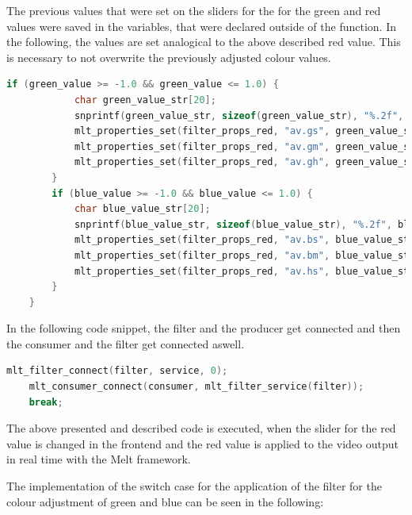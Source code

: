\documentclass[../MasterThesis.tex]{subfiles}
\begin{document}
The previous values that were set on the sliders for the for the green and red values were saved in the variables, that were declared outside of the function. In the following, the values are set analogical to the above described red value. This is necessary to not overwrite the previously adjusted colour values.
	
\begin{lstlisting}[language=c, numbers=none, columns=fullflexible]
		if (green_value >= -1.0 && green_value <= 1.0) {
			char green_value_str[20]; 
			snprintf(green_value_str, sizeof(green_value_str), "%.2f", green_value);
			mlt_properties_set(filter_props_red, "av.gs", green_value_str);
			mlt_properties_set(filter_props_red, "av.gm", green_value_str);	
			mlt_properties_set(filter_props_red, "av.gh", green_value_str);
		} 			
		if (blue_value >= -1.0 && blue_value <= 1.0) {
			char blue_value_str[20]; 
			snprintf(blue_value_str, sizeof(blue_value_str), "%.2f", blue_value);
			mlt_properties_set(filter_props_red, "av.bs", blue_value_str);
			mlt_properties_set(filter_props_red, "av.bm", blue_value_str);	
			mlt_properties_set(filter_props_red, "av.hs", blue_value_str);
		}					
	}
\end{lstlisting}

In the following code snippet, the filter and the producer get connected and then the consumer and the filter get connected aswell.


\begin{lstlisting}[language=c, numbers=none, columns=fullflexible]
	mlt_filter_connect(filter, service, 0);
	mlt_consumer_connect(consumer, mlt_filter_service(filter));
	break;			
\end{lstlisting}

The above presented and described code is executed, when the slider for the red value is changed in the frontend and the red value is applied to the video output in real time with the Melt framework.

The implementation of the switch case for the application of the filter for the colour adjustment of green and blue can be seen in the following:

\newpage
\end{document}
